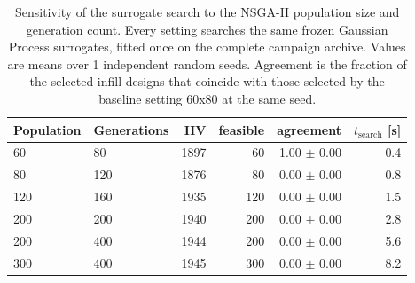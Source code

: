 \begin{table}[htbp]
\centering
\caption{Sensitivity of the surrogate search to the NSGA-II population size and generation count. Every setting searches the same frozen Gaussian Process surrogates, fitted once on the complete campaign archive. Values are means over 1 independent random seeds. Agreement is the fraction of the selected infill designs that coincide with those selected by the baseline setting 60x80 at the same seed.}
\label{tab:nsga_sensitivity}
\begin{tabular}{llrrrr}
\toprule
Population & Generations & HV & feasible & agreement & $t_{\mathrm{search}}$ [s] \\
\midrule
60 & 80 & 1897 & 60 & 1.00 $\pm$ 0.00 & 0.4 \\
80 & 120 & 1876 & 80 & 0.00 $\pm$ 0.00 & 0.8 \\
120 & 160 & 1935 & 120 & 0.00 $\pm$ 0.00 & 1.5 \\
200 & 200 & 1940 & 200 & 0.00 $\pm$ 0.00 & 2.8 \\
200 & 400 & 1944 & 200 & 0.00 $\pm$ 0.00 & 5.6 \\
300 & 400 & 1945 & 300 & 0.00 $\pm$ 0.00 & 8.2 \\
\bottomrule
\end{tabular}
\end{table}
